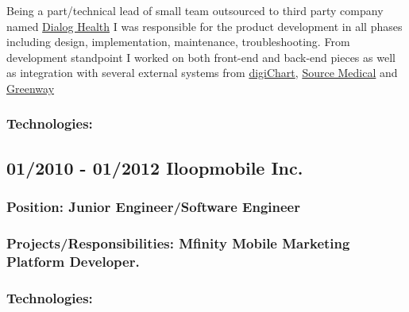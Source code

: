 \documentclass[a4paper]{article}
\begin{document}
Being a part/technical lead of small team outsourced to third party company named \href{http://www.dialoghealth.com/}{Dialog Health} I was responsible for the product development in all phases including design, implementation, maintenance, troubleshooting. From development standpoint I worked on both front-end and back-end pieces as well as integration with several external systems from \href{http://www.digichart.com/}{digiChart}, \href{http://sourcemed.net/}{Source Medical} and \href{http://www.greenwayhealth.com/}{Greenway} 

\subsubsection*{Technologies:} 



\subsection*{01/2010 - 01/2012 Iloopmobile Inc.}

\subsubsection*{Position:  \textcolor[RGB]{140,140,140} {Junior Engineer/Software Engineer} }

\subsubsection*{Projects/Responsibilities: Mfinity Mobile Marketing Platform Developer.} 



\subsubsection* {Technologies:}

\end{document}
